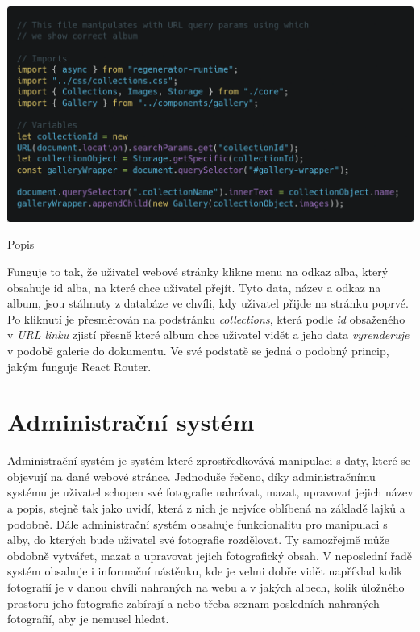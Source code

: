 \documentclass[12pt,a4paper]{report}
\begin{document}
  \vspace*{0.5cm}
  \noindent\includegraphics[width=\linewidth]{vanillaJsRoutingCodeblock.png}
  \begin{center}
    Popis
  \end{center}
  \vspace*{0.5cm}

  Funguje to tak, že uživatel webové stránky klikne menu na odkaz alba, který obsahuje id alba, na které chce uživatel přejít.
  Tyto data, název a odkaz na album, jsou stáhnuty z databáze ve chvíli, kdy uživatel přijde na stránku poprvé.
  Po kliknutí je přesměrován na podstránku \emph{collections}, která podle \emph{id} obsaženého v \emph{URL linku}
  zjistí přesně které album chce uživatel vidět a jeho data \emph{vyrenderuje} v podobě galerie do dokumentu.
  Ve své podstatě se jedná o podobný princip, jakým funguje React Router.

  \chapter{Administrační systém}
 
  Administrační systém je systém které zprostředkovává manipulaci s daty, které se objevují na
  dané webové stránce. Jednoduše řečeno, díky administračnímu systému je uživatel schopen své
  fotografie nahrávat, mazat, upravovat jejich název a popis, stejně tak jako uvidí, která z nich je
  nejvíce oblíbená na základě lajků a podobně. Dále administrační systém obsahuje funkcionalitu
  pro manipulaci s alby, do kterých bude uživatel své fotografie rozdělovat. Ty samozřejmě může
  obdobně vytvářet, mazat a upravovat jejich fotografický obsah. V neposlední řadě systém
  obsahuje i informační nástěnku, kde je velmi dobře vidět například kolik fotografií je v danou chvíli
  nahraných na webu a v jakých albech, kolik úložného prostoru jeho fotografie zabírají a nebo
  třeba seznam posledních nahraných fotografií, aby je nemusel hledat.
\end{document}
